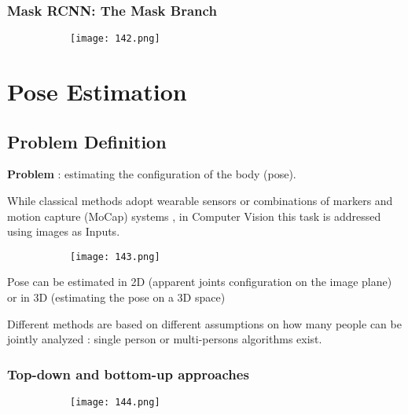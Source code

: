 \documentclass{article}
\begin{document}
\subsubsection{Mask RCNN: The Mask Branch}


\begin{figure}[ht!]
  \centering
  \begin{subfigure}[b]{0.7\linewidth}
    \texttt{[image: 142.png]}
  \end{subfigure}
\end{figure}

\section{Pose Estimation}

\subsection{Problem Definition}

\textbf{Problem} : estimating the configuration of the body (pose).

While classical methods adopt wearable sensors or combinations of markers and motion capture (MoCap) systems , in Computer Vision this task is addressed using images as Inputs.

\begin{figure}[ht!]
  \centering
  \begin{subfigure}[b]{0.4\linewidth}
    \texttt{[image: 143.png]}
  \end{subfigure}
\end{figure}

Pose can be estimated in 2D (apparent joints configuration on the image plane) or in 3D (estimating the pose on a 3D space)

Different methods are based on different assumptions on how many people can be jointly analyzed : single person or multi-persons algorithms exist.

\subsubsection{Top-down and bottom-up approaches}


\begin{figure}[ht!]
  \centering
  \begin{subfigure}[b]{0.6\linewidth}
    \texttt{[image: 144.png]}
  \end{subfigure}
\end{figure}
\end{document}
